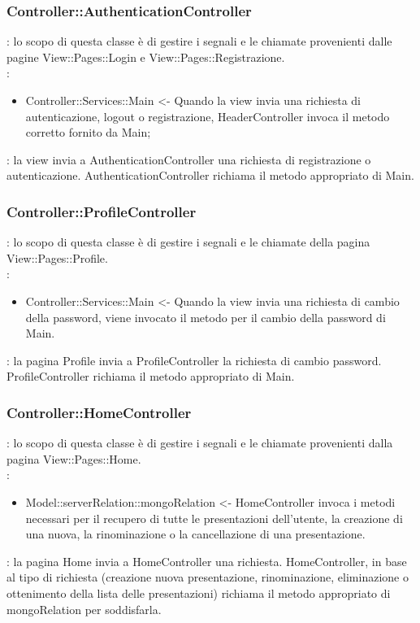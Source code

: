{	\subsubsection{Controller::\-AuthenticationController}{
		\textbf{\tipo}: lo scopo di questa classe è di gestire i segnali e le chiamate provenienti dalle pagine View::\-Pages::\-Login e View::\-Pages::\-Registrazione.\\	
		\textbf{\relaz}:
		\begin{itemize}
			\item Controller::\-Services::\-Main <- Quando la view invia una richiesta di autenticazione, logout o registrazione, HeaderController invoca il metodo corretto fornito da Main;
		\end{itemize}
		\textbf{\interfacce}: la view invia a AuthenticationController una richiesta di registrazione o autenticazione. AuthenticationController richiama il metodo appropriato di Main.
	}
			
	\subsubsection{Controller::\-ProfileController}{
		\textbf{\tipo}: lo scopo di questa classe è di gestire i segnali e le chiamate della pagina View::\-Pages::\-Profile.\\	
		\textbf{\relaz}:
		\begin{itemize}
			\item Controller::\-Services::\-Main <- Quando la view invia una richiesta di cambio della password, viene invocato il metodo per il cambio della password di Main.
		\end{itemize}
		\textbf{\interfacce}: la pagina Profile invia a ProfileController la richiesta di cambio password. ProfileController richiama il metodo appropriato di Main.
	}

	\subsubsection{Controller::\-HomeController}{
		\textbf{\tipo}: lo scopo di questa classe è di gestire i segnali e le chiamate provenienti dalla pagina View::\-Pages::\-Home.\\	
		\textbf{\relaz}:
		\begin{itemize}
			\item Model::\-serverRelation::\-mongoRelation <- HomeController invoca i metodi necessari per il recupero di tutte le presentazioni dell'utente, la creazione di una nuova, la rinominazione o la cancellazione di una presentazione.
		\end{itemize}
		\textbf{\interfacce}: la pagina Home invia a HomeController una richiesta. HomeController, in base al tipo di richiesta (creazione nuova presentazione, rinominazione, eliminazione o ottenimento della lista delle presentazioni) richiama il metodo appropriato di mongoRelation per soddisfarla.
	}


}
